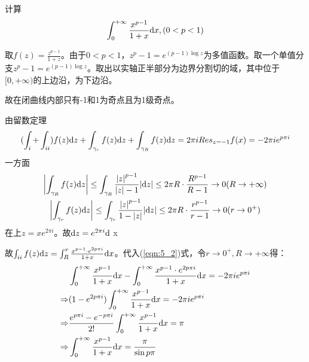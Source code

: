 \begin{eg}
	\color{blue}计算\begin{equation*}
	\int_0^{+\infty}\frac{x^{p-1}}{1+x}\mathrm{d}x,(0<p<1)
	\end{equation*}\color{black}
\end{eg}
\begin{jie}{}
取$f(z)=\frac{z^{p-1}}{1+z}$。由于$0<p<1$，$z^p-1=e^{(p-1)\log z}$为多值函数。取一个单值分支$z^p-1=e^{(p-1)\log z}$。取出以实轴正半部分为边界分割切的域，其中\uppercase\expandafter{}位于$[0,+\infty)$的上边沿，\uppercase\expandafter{}为下边沿。\par
故在闭曲线内部只有-1和1为奇点且为1级奇点。\par
	由留数定理
	\begin{equation}
		(\int_{\uppercase\expandafter{\romannumeral1}}+\int_{\uppercase\expandafter{\romannumeral2}})f(z)\di z +\int_{\gamma_r}f(z)\di z+\int_{\gamma_R}f(z)\di z=2\pi i Res_{z=-1}f(x)=-2\pi i e^{p \pi i}\label{eqn:5_2}
	\end{equation} 
	一方面
	\begin{gather*}
	\left| \int_{\gamma_R}f(z)\mathrm{d}z \right| \le \int_{\gamma_R}\frac{\left| z\right| ^{p-1}}{\left| z\right| -1} {\left| \mathrm{d}z\right|}\le 2\pi R\cdot \frac{R^{p-1}}{R-1}\to 0(R\to +\infty)\\ \left| \int_{\gamma_r}f(z)\mathrm{d}z \right| \le \int_{\gamma_r}\frac{\left| z\right| ^{p-1}}{1 - \left| z\right| } {\left| \mathrm{d}z\right|}\le 2\pi R\cdot \frac{r^{p-1}}{r-1}\to 0(r\to 0^+)
	\end{gather*}
	在\uppercase\expandafter{}上$z=xe^{2\pi i}$。故$\di z=e^{2\pi i}\di$ x\par
	故$\int_{\uppercase\expandafter{\romannumeral2}}f(z)\di z=\int_R^r \frac{x^{p-1}\cdot e^{2p\pi i}}{1+x}\di x$。代入(\ref{eqn:5_2})式，令$r\to 0^+, R\to + \infty$得：
	\begin{align*}
	&\int_0^{+ \infty} \frac{x^{p-1}}{1+x}\mathrm{d}x - \int_0^{+ \infty} \frac{x^{p-1}\cdot e^{2p\pi i}}{1+x}\mathrm{d}x =-2\pi i e^{p \pi i}\\
	\Rightarrow &(1-e^{2p\pi i})\int_0^{+\infty}\frac{x^{p-1}}{1+x}\mathrm{d}x=-2\pi i e^{p \pi i}\\
	\Rightarrow &\frac{e^{p\pi i}-e^{-p\pi i}}{2!}\int_0^{+\infty}\frac{x^{p-1}}{1+x}\mathrm{d}x=\pi\\
	\Rightarrow &\int_0^{+\infty}\frac{x^{p-1}}{1+x}\mathrm{d}x=\frac{\pi}{\sin  p\pi}
	\end{align*}
\end{jie}
